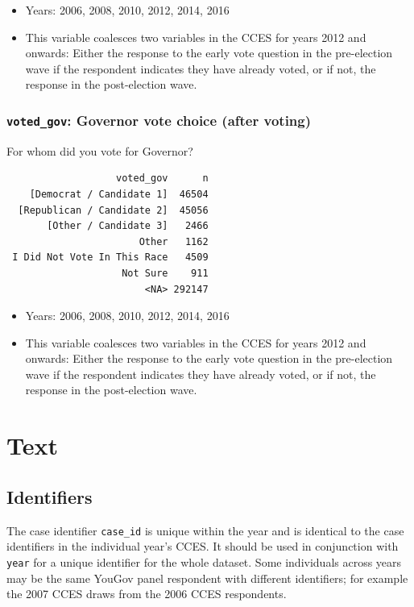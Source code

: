 \documentclass[10pt,article,oneside]{memoir}
\theoremstyle{definition}
\begin{document}
\begin{itemize}
\tightlist
\item
  Years: 2006, 2008, 2010, 2012, 2014, 2016
\item
  This variable coalesces two variables in the CCES for years 2012 and
  onwards: Either the response to the early vote question in the
  pre-election wave if the respondent indicates they have already voted,
  or if not, the response in the post-election wave.
\end{itemize}

\subsubsection{\texorpdfstring{\texttt{voted\_gov}: Governor vote choice
(after
voting)}{voted\_gov: Governor vote choice (after voting)}}\label{voted_gov-governor-vote-choice-after-voting}

For whom did you vote for Governor?

\begin{verbatim}
                   voted_gov      n
    [Democrat / Candidate 1]  46504
  [Republican / Candidate 2]  45056
       [Other / Candidate 3]   2466
                       Other   1162
 I Did Not Vote In This Race   4509
                    Not Sure    911
                        <NA> 292147
\end{verbatim}

\begin{itemize}
\tightlist
\item
  Years: 2006, 2008, 2010, 2012, 2014, 2016
\item
  This variable coalesces two variables in the CCES for years 2012 and
  onwards: Either the response to the early vote question in the
  pre-election wave if the respondent indicates they have already voted,
  or if not, the response in the post-election wave.
\end{itemize}

\newpage

\section{Text}\label{text}

\subsection{Identifiers}\label{identifiers}

The case identifier \texttt{case\_id} is unique within the year and is
identical to the case identifiers in the individual year's CCES. It
should be used in conjunction with \texttt{year} for a unique identifier
for the whole dataset. Some individuals across years may be the same
YouGov panel respondent with different identifiers; for example the 2007
CCES draws from the 2006 CCES respondents.
\end{document}
